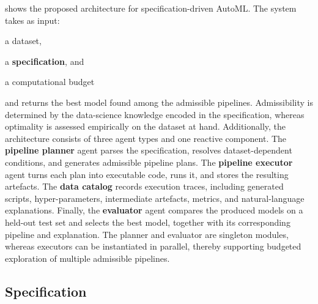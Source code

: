 \documentclass[runningheads]{llncs}
\begin{document}
 shows the proposed architecture for specification-driven \ac{AutoML}.
%
The system takes as input:
\begin{inlinelist}
  \item a dataset,
  \item a \textbf{specification}, %
  and
  \item a computational budget
\end{inlinelist}
and returns the best model found among the admissible pipelines.
%
Admissibility is determined by the data-science knowledge encoded in the specification,
whereas optimality is assessed empirically on the dataset at hand.
%
Additionally, the architecture consists of three agent types and one reactive component.
%
The \textbf{pipeline planner} agent parses the specification,
resolves dataset-dependent conditions,
and generates admissible pipeline plans.
%
The \textbf{pipeline executor} agent turns each plan into executable code,
runs it,
and stores the resulting artefacts.
%
The \textbf{data catalog} records execution traces,
including generated scripts,
hyper-parameters,
intermediate artefacts,
metrics,
and natural-language explanations.
%
Finally,
the \textbf{evaluator} agent compares the produced models on a held-out test set
and selects the best model,
together with its corresponding pipeline and explanation.
%
The planner and evaluator are singleton modules,
whereas executors can be instantiated in parallel,
thereby supporting budgeted exploration of multiple admissible pipelines.

\subsection{Specification}
\label{subsec:specification}
\end{document}
